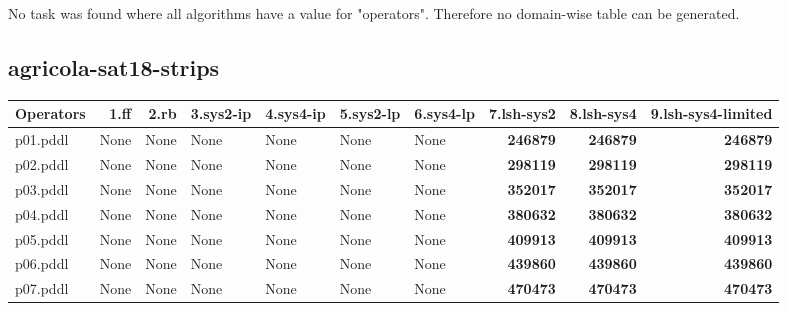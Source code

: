 \documentclass{article}
\begin{document}
No task was found where all algorithms have a value for "operators". Therefore no domain-wise table can be generated.

\hypertarget{operators-agricola-sat18-strips}{}
\subsection*{agricola-sat18-strips}

\begin{tabular}{@{}lrrrrrrrrr@{}}
Operators & 1.ff & 2.rb & 3.sys2-ip & 4.sys4-ip & 5.sys2-lp & 6.sys4-lp & 7.lsh-sys2 & 8.lsh-sys4 & 9.lsh-sys4-limited \\
\midrule
p01.pddl & \multicolumn{1}{|l|}{None} & \multicolumn{1}{|l|}{None} & \multicolumn{1}{|l|}{None} & \multicolumn{1}{|l|}{None} & \multicolumn{1}{|l|}{None} & \multicolumn{1}{|l|}{None} & \textbf{246879} & \textbf{246879} & \textbf{246879} \\
p02.pddl & \multicolumn{1}{|l|}{None} & \multicolumn{1}{|l|}{None} & \multicolumn{1}{|l|}{None} & \multicolumn{1}{|l|}{None} & \multicolumn{1}{|l|}{None} & \multicolumn{1}{|l|}{None} & \textbf{298119} & \textbf{298119} & \textbf{298119} \\
p03.pddl & \multicolumn{1}{|l|}{None} & \multicolumn{1}{|l|}{None} & \multicolumn{1}{|l|}{None} & \multicolumn{1}{|l|}{None} & \multicolumn{1}{|l|}{None} & \multicolumn{1}{|l|}{None} & \textbf{352017} & \textbf{352017} & \textbf{352017} \\
p04.pddl & \multicolumn{1}{|l|}{None} & \multicolumn{1}{|l|}{None} & \multicolumn{1}{|l|}{None} & \multicolumn{1}{|l|}{None} & \multicolumn{1}{|l|}{None} & \multicolumn{1}{|l|}{None} & \textbf{380632} & \textbf{380632} & \textbf{380632} \\
p05.pddl & \multicolumn{1}{|l|}{None} & \multicolumn{1}{|l|}{None} & \multicolumn{1}{|l|}{None} & \multicolumn{1}{|l|}{None} & \multicolumn{1}{|l|}{None} & \multicolumn{1}{|l|}{None} & \textbf{409913} & \textbf{409913} & \textbf{409913} \\
p06.pddl & \multicolumn{1}{|l|}{None} & \multicolumn{1}{|l|}{None} & \multicolumn{1}{|l|}{None} & \multicolumn{1}{|l|}{None} & \multicolumn{1}{|l|}{None} & \multicolumn{1}{|l|}{None} & \textbf{439860} & \textbf{439860} & \textbf{439860} \\
p07.pddl & \multicolumn{1}{|l|}{None} & \multicolumn{1}{|l|}{None} & \multicolumn{1}{|l|}{None} & \multicolumn{1}{|l|}{None} & \multicolumn{1}{|l|}{None} & \multicolumn{1}{|l|}{None} & \textbf{470473} & \textbf{470473} & \textbf{470473} \\

\end{tabular}
\end{document}

